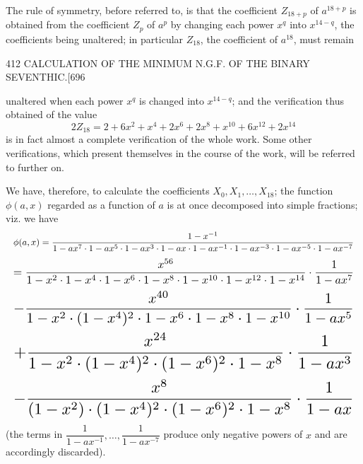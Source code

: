 \documentclass[11pt]{article}
\begin{document}
The rule of symmetry, before referred to, is that the coefficient $Z_{18+p}$ of $a^{18+p}$ is obtained from the coefficient $Z_{p}$ of $a^{p}$ by changing each power $x^{q}$ into $x^{14-q}$, the coefficients being unaltered; in particular $Z_{18}$, the coefficient of $a^{18}$, must remain

\clearpage
\begin{center}\small 412 \hfill CALCULATION OF THE MINIMUM N.G.F. OF THE BINARY SEVENTHIC.\hfill [696\end{center}

unaltered when each power $x^{q}$ is changed into $x^{14-q}$; and the verification thus obtained of the value
\[ 2 Z_{18} = 2 + 6x^{2} + x^{4} + 2x^{6} + 2x^{8} + x^{10} + 6x^{12} + 2x^{14} \]
is in fact almost a complete verification of the whole work. Some other verifications, which present themselves in the course of the work, will be referred to further on.

We have, therefore, to calculate the coefficients $X_{0}, X_{1}, \dots, X_{18}$; the function $\phi(a, x)$ regarded as a function of $a$ is at once decomposed into simple fractions; viz. we have
\[ \resizebox{\textwidth}{!}{$\displaystyle \phi(a,x) = \frac{1 - x^{-1}}{1 - ax^{7}\cdot 1 - ax^{5}\cdot 1 - ax^{3}\cdot 1 - ax\cdot 1 - ax^{-1}\cdot 1 - ax^{-3}\cdot 1 - ax^{-5}\cdot 1 - ax^{-7}}$} \]
\[ \resizebox{\textwidth}{!}{$\displaystyle = \frac{x^{56}}{1 - x^{2}\cdot 1 - x^{4}\cdot 1 - x^{6}\cdot 1 - x^{8}\cdot 1 - x^{10}\cdot 1 - x^{12}\cdot 1 - x^{14}}\cdot\frac{1}{1 - ax^{7}}$} \]
\[ \resizebox{\textwidth}{!}{$\displaystyle - \frac{x^{40}}{1 - x^{2}\cdot (1 - x^{4})^{2}\cdot 1 - x^{6}\cdot 1 - x^{8}\cdot 1 - x^{10}}\cdot\frac{1}{1 - ax^{5}}$} \]
\[ \resizebox{\textwidth}{!}{$\displaystyle + \frac{x^{24}}{1 - x^{2}\cdot (1 - x^{4})^{2}\cdot (1 - x^{6})^{2}\cdot 1 - x^{8}}\cdot\frac{1}{1 - ax^{3}}$} \]
\[ \resizebox{\textwidth}{!}{$\displaystyle - \frac{x^{8}}{(1 - x^{2})\cdot (1 - x^{4})^{2}\cdot (1 - x^{6})^{2}\cdot 1 - x^{8}}\cdot\frac{1}{1 - ax}$} \]
(the terms in $\dfrac{1}{1-ax^{-1}}, \dots, \dfrac{1}{1-ax^{-7}}$ produce only negative powers of $x$ and are accordingly discarded).
\end{document}
